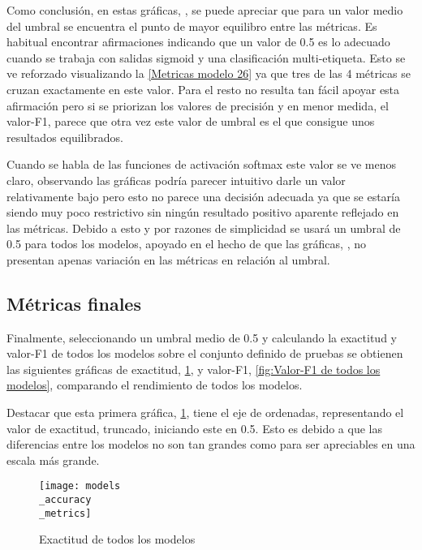 Como conclusión, en estas gráficas, , se puede apreciar que para un valor medio del umbral se encuentra el
punto de mayor equilibro entre las métricas. Es habitual encontrar afirmaciones
indicando que un valor de 0.5 es lo adecuado cuando se trabaja con salidas
sigmoid y una clasificación multi-etiqueta. Esto se ve reforzado visualizando la
\cref{Metricas modelo 26} ya que tres de las 4 métricas se cruzan exactamente en
este valor. Para el resto no resulta tan fácil apoyar esta afirmación pero si se
priorizan los valores de precisión y en menor medida, el valor-F1, parece que
otra vez este valor de umbral es el que consigue unos resultados equilibrados. 

Cuando se habla de las funciones de activación softmax este valor se ve menos
claro, observando las gráficas podría parecer intuitivo darle un valor
relativamente bajo pero esto no parece una decisión adecuada ya que se estaría
siendo muy poco restrictivo sin ningún resultado positivo aparente reflejado en
las métricas. Debido a esto y por razones de simplicidad se usará un umbral de
0.5 para todos los modelos, apoyado en el hecho de que las gráficas,
, no presentan apenas variación en
las métricas en relación al umbral.

\subsection{Métricas finales}
Finalmente, seleccionando un umbral medio de 0.5 y calculando la exactitud y
valor-F1 de todos los modelos sobre el conjunto definido de pruebas se obtienen
las siguientes gráficas de exactitud, \cref{fig:Exactitud de todos los modelos},
y valor-F1, \cref{fig:Valor-F1 de todos los modelos}, comparando el rendimiento
de todos los modelos.

Destacar que esta primera gráfica, \cref{fig:Exactitud de todos los modelos},
tiene el eje de ordenadas, representando el valor de exactitud, truncado,
iniciando este en 0.5. Esto es debido a que las diferencias entre los modelos no
son tan grandes como para ser apreciables en una escala más grande.

\begin{figure}[H]
    \centering
    \texttt{[image: models\\\_accuracy\\\_metrics]}
    \captionsetup{justification=centering}
    \caption{Exactitud de todos los modelos}
    \label{fig:Exactitud de todos los modelos}
\end{figure}

